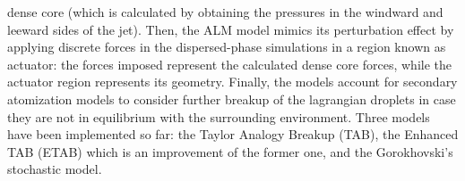 dense core (which is calculated by obtaining the pressures in the windward and leeward sides of the jet). Then, the ALM model mimics its perturbation effect by applying discrete forces in the dispersed-phase simulations in a region known as actuator: the forces imposed represent the calculated dense core forces, while the actuator region represents its geometry. Finally, the models account for secondary atomization models to consider further breakup of the lagrangian droplets in case they are not in equilibrium with the surrounding environment. Three models have been implemented so far: the Taylor Analogy Breakup (TAB), the Enhanced TAB (ETAB) which is an improvement of the former one, and the Gorokhovski's stochastic model.
%
%
%
